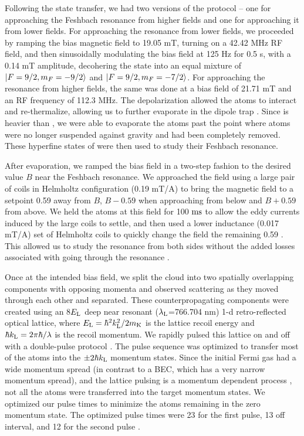\documentclass[12pt]{iopart}
\begin{document}
Following the state transfer, we had two versions of the protocol \--- one for approaching the Feshbach resonance from higher fields and one for approaching it from lower fields. For approaching the resonance from lower fields, we proceeded by ramping the bias magnetic field to 19.05 mT, turning on a 42.42 MHz RF field, and then sinusoidally modulating the bias field at 125 Hz for 0.5 s, with a 0.14 mT amplitude, decohering the \K{} state into an equal mixture of $\mathinner{|{F=9/2,m_F=-9/2}\rangle}$ and $\mathinner{|{F=9/2,m_F=-7/2}\rangle}$. For approaching the resonance from higher fields, the same was done at a bias field of 21.71 mT and an RF frequency of 112.3 MHz. The depolarization allowed the \K{} atoms to interact and re-thermalize, allowing us to further evaporate in the dipole trap \cite{DeMarco99}. Since \Rb{} is heavier than \K{}, we were able to evaporate the \K{} atoms past the point where \Rb{} atoms were no longer suspended against gravity and had been completely removed.  These hyperfine states of \K{} were then used to study their Feshbach resonance.
\par After evaporation, we ramped the bias field in a two-step fashion to the desired value $B$ near the Feshbach resonance. We approached the field using a large pair of  coils in Helmholtz configuration (0.19 mT/A) to bring the magnetic field to a setpoint 0.59 \mT{} away from $B$,  $B-0.59$ \mT{} when approaching from below and $B+0.59$  \mT{} from above. We held the atoms at this field for 100 $\rm{ms}$ to allow the eddy currents induced by the large coils to settle, and then used a lower inductance (0.017 mT/A) set of Helmholtz coils to quickly change the field the remaining 0.59 \mT{}. This allowed us to study the resonance from both sides without the added losses associated with going through the resonance \cite{Chin10}.

Once at the intended bias field, we split the cloud into two spatially overlapping components with opposing momenta  and observed scattering as they moved through each other and separated. These counterpropagating components were created using an  8$E_{\rm{L}}$ deep near resonant ($\lambda_{\rm{L}}$=766.704 nm) 1-d retro-reflected optical lattice, where $E_{\rm{L}}=\hbar^2 k_{\rm{L}}^2/2m_{\rm{K}}$ is the lattice recoil energy and $\hbar k_{\rm{L}}=2\pi \hbar/ \lambda$ is the recoil momentum. We rapidly pulsed this lattice on and off with a double-pulse protocol \cite{Wu05, Edwards10}. The pulse sequence was optimized to transfer most of the atoms into the $\pm 2 \hbar k_{\rm{L}}$ momentum states. Since the initial Fermi gas had a wide momentum spread (in contrast to a BEC, which has a very narrow momentum spread), and the lattice pulsing is a momentum dependent process  \cite{Wu05}, not all the atoms were transferred into the target momentum states. We optimized our pulse times to minimize the atoms remaining in the zero momentum state. The optimized pulse times were 23 \us{} for the first pulse, 13 \us{} off interval, and 12 \us{} for the second pulse \cite{Edwards10}.
\end{document}
